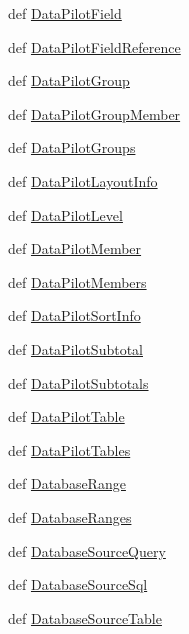 \begin{DoxyCompactItemize}
\item 
def \hyperlink{namespaceodf_1_1table_ac6f58a0d871a0cea1d416416a77e9343}{Data\+Pilot\+Field}
\item 
def \hyperlink{namespaceodf_1_1table_a22e0f709444e4bf20b581308af54d666}{Data\+Pilot\+Field\+Reference}
\item 
def \hyperlink{namespaceodf_1_1table_ad8a17a64c93ccbb8fe508b37bc3db656}{Data\+Pilot\+Group}
\item 
def \hyperlink{namespaceodf_1_1table_aadcdccd204eb3ee3b50cfc2526eb987b}{Data\+Pilot\+Group\+Member}
\item 
def \hyperlink{namespaceodf_1_1table_a54c9fc49a34a4dc29680eeb2c811afc3}{Data\+Pilot\+Groups}
\item 
def \hyperlink{namespaceodf_1_1table_ace2676b44db9b416b3c99883f279959d}{Data\+Pilot\+Layout\+Info}
\item 
def \hyperlink{namespaceodf_1_1table_a654370f778a7215959e164bcd1d1082e}{Data\+Pilot\+Level}
\item 
def \hyperlink{namespaceodf_1_1table_aae901f6c24c4da38b70e13d4596e030a}{Data\+Pilot\+Member}
\item 
def \hyperlink{namespaceodf_1_1table_aeba41d3b53223307e6b6d0efedab3629}{Data\+Pilot\+Members}
\item 
def \hyperlink{namespaceodf_1_1table_a2748de351dacfd19fc6e1196389c8386}{Data\+Pilot\+Sort\+Info}
\item 
def \hyperlink{namespaceodf_1_1table_a394187a0f38ec3188a8dfe641f37a09f}{Data\+Pilot\+Subtotal}
\item 
def \hyperlink{namespaceodf_1_1table_a7877856aec90839b7074c1e5de433f2c}{Data\+Pilot\+Subtotals}
\item 
def \hyperlink{namespaceodf_1_1table_ae58f541a31917cbb6a0ba3da1e661df4}{Data\+Pilot\+Table}
\item 
def \hyperlink{namespaceodf_1_1table_affeace399cc02a75c8bf8ada85885a00}{Data\+Pilot\+Tables}
\item 
def \hyperlink{namespaceodf_1_1table_ab223136608ef20f9dcab3d58d413ce29}{Database\+Range}
\item 
def \hyperlink{namespaceodf_1_1table_acaf6461831921889b723f8df777630bf}{Database\+Ranges}
\item 
def \hyperlink{namespaceodf_1_1table_a2950fc3b5dfbbe182a5544720655cf49}{Database\+Source\+Query}
\item 
def \hyperlink{namespaceodf_1_1table_a05ee1fa415db2eee8fc8507741402554}{Database\+Source\+Sql}
\item 
def \hyperlink{namespaceodf_1_1table_a0a58dc1b94224bea50d30e5c9a6bd565}{Database\+Source\+Table}

\end{DoxyCompactItemize}
